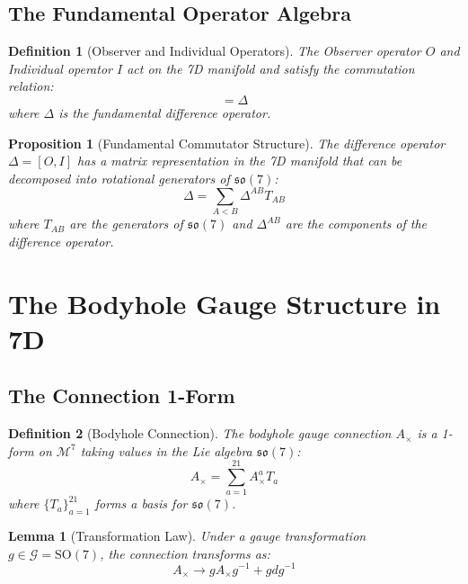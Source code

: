 \documentclass{article}
\newcommand{\SO}{\mathrm{SO}}
\newtheorem{proposition}{Proposition}
\newtheorem{lemma}{Lemma}
\newtheorem{definition}{Definition}
\begin{document}
\subsection{The Fundamental Operator Algebra}

\begin{definition}[Observer and Individual Operators]
The Observer operator $O$ and Individual operator $I$ act on the 7D manifold and satisfy the commutation relation:
\begin{equation}
[O, I] = \Delta
\end{equation}
where $\Delta$ is the fundamental difference operator.
\end{definition}

\begin{proposition}[Fundamental Commutator Structure]
The difference operator $\Delta = [O, I]$ has a matrix representation in the 7D manifold that can be decomposed into rotational generators of $\mathfrak{so}(7)$:
\begin{equation}
\Delta = \sum_{A<B} \Delta^{AB} T_{AB}
\end{equation}
where $T_{AB}$ are the generators of $\mathfrak{so}(7)$ and $\Delta^{AB}$ are the components of the difference operator.
\end{proposition}

\section{The Bodyhole Gauge Structure in 7D}

\subsection{The Connection 1-Form}

\begin{definition}[Bodyhole Connection]
The bodyhole gauge connection $A_{\times}$ is a 1-form on $\mathcal{M}^7$ taking values in the Lie algebra $\mathfrak{so}(7)$:
\begin{equation}
A_{\times} = \sum_{a=1}^{21} A^a_{\times} T_a
\end{equation}
where $\{T_a\}_{a=1}^{21}$ forms a basis for $\mathfrak{so}(7)$.
\end{definition}

\begin{lemma}[Transformation Law]
Under a gauge transformation $g \in \mathcal{G} = \SO(7)$, the connection transforms as:
\begin{equation}
A_{\times} \to g A_{\times} g^{-1} + g dg^{-1}
\end{equation}
\end{lemma}
\end{document}
